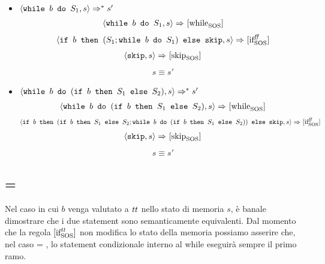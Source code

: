 \begin{itemize}
  \item $\confSs{\wbS{b}{S_1}}{s} \Rar{*} s'$
\begin{align*}
\confSs{\wbS{b}{S_1}}{s} \Rar{}
\whileSOS
\end{align*}
\begin{align*}
\confSs{\ifABC{b}{(S_1;\wbS{b}{S_1})}{\skipForFriends}}{s} \Rar{}
\ifffSOS
\end{align*}
\begin{align*}
\confSs{\skipForFriends}{s} \Rar{}
\skipSOS
\end{align*}
\begin{align*}
s \equiv s'
\end{align*}
  \item $\confSs{\wbS{b}{(\ifABC{b}{S_1}{S_2})}}{s} \Rar{*} s'$
\begin{align*}
\confSs{\wbS{b}{(\ifABC{b}{S_1}{S_2})}}{s} \Rar{}
\whileSOS
\end{align*}
\begin{align*}
\confSs{\ifABC{b}
              {(\ifABC{b}{S_1}{S_2}; \wbS{b}{(\ifABC{b}{S_1}{S_2})})}
              {\skipForFriends}}
       {s} \Rar{}
\ifffSOS
\end{align*}
\begin{align*}
\confSs{\skipForFriends}{s} \Rar{}
\skipSOS
\end{align*}
\begin{align*}
s \equiv s'
\end{align*}
\end{itemize}

\subsection{ = \semtrue}

Nel caso in cui $b$ venga valutato a $\semtrue$ nello stato di memoria $s$, è
banale dimostrare che i due statement sono semanticamente equivalenti. Dal 
momento che la regola $\ifttSOS{}$ non modifica lo stato della memoria
possiamo asserire che, nel caso  = \semtrue, lo 
statement condizionale interno al while eseguirà sempre il primo ramo.

